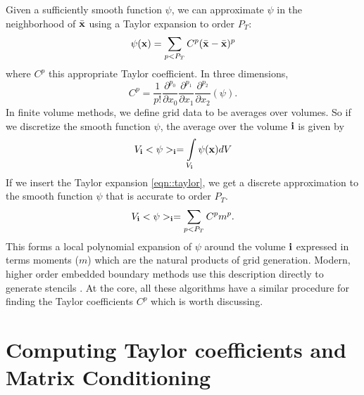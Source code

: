 \documentclass{article}
\newcommand{\ibold}{{\bf i}}
\newcommand{\xbold}{{\bf x}}
\newcommand{\xbar}{{\bar {\bf x}}}
\begin{document}
 
Given a sufficiently smooth function $\psi$, we can approximate $\psi$
in the neighborhood of $\xbar$ using a Taylor expansion to order $P_T$:
\begin{equation}
\psi(\xbold)  =  \sum\limits_{p < P_T} C^p (\xbar -\xbar)^p
\label{eqn::taylor}
\end{equation}
where $C^p$ this appropriate Taylor coefficient.  In three dimensions,
\begin{equation}
  C^p =\frac{1}{p!}
      \frac{\partial^{p_0}}{\partial x_0}
      \frac{\partial^{p_1}}{\partial x_1}
      \frac{\partial^{p_2}}{\partial x_2}  (\psi).
\end{equation}  
In finite volume  methods, we define grid data to be
averages over volumes.   So if we discretize the smooth function
$\psi$, the average over the volume $\ibold$ is given by
\begin{equation*}
 V_\ibold <\psi>_\ibold = \int\limits_{V_\ibold} \psi(\xbold) dV
\end{equation*}
If we insert the Taylor expansion \ref{eqn::taylor}, we get a discrete
approximation to the smooth function $\psi$ that is accurate to order $P_T$.
\begin{equation*}
 V_\ibold <\psi>_\ibold = \sum\limits_{p < P_T} C^p m^p. 
\end{equation*}
This forms a local polynomial expansion of $\psi$ around the volume
$\ibold$ expressed in terms moments ($m$) which are the natural
products of grid generation.  Modern, higher order embedded boundary
methods use this description directly to generate stencils
\cite{Overton2022a, Devendran2017, Schwartz2015}.  At the
core, all these algorithms have a similar procedure for finding the
Taylor coefficients $C^p$ which is worth discussing.  \footnotemark[8]


\section{Computing Taylor coefficients and Matrix Conditioning}
\end{document}
